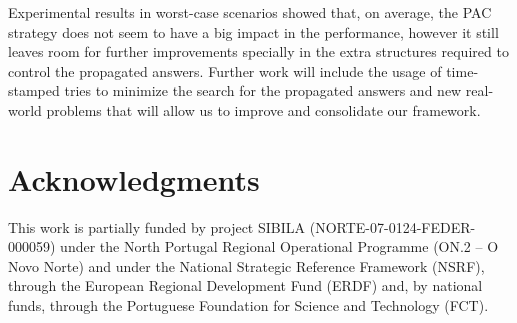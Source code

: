 \documentclass{llncs}
\begin{document}
Experimental results in worst-case scenarios showed that, on average,
the PAC strategy does not seem to have a big impact in the
performance, however it still leaves room for further improvements
specially in the extra structures required to control the propagated
answers. Further work will include the usage of time-stamped tries to
minimize the search for the propagated answers and new real-world
problems that will allow us to improve and consolidate our framework.


\section*{Acknowledgments}

This work is partially funded by project SIBILA
(NORTE-07-0124-FEDER-000059) under the North Portugal Regional
Operational Programme (ON.2 – O Novo Norte) and under the National
Strategic Reference Framework (NSRF), through the European Regional
Development Fund (ERDF) and, by national funds, through the Portuguese
Foundation for Science and Technology (FCT).





\end{document}
